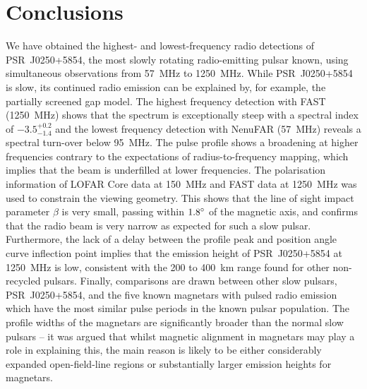 \section{Conclusions}
\label{sec: J0250 - conclusions}

We have obtained the highest- and lowest-frequency radio detections of PSR~J0250+5854, the most slowly rotating radio-emitting pulsar known, using simultaneous observations from 57~MHz to 1250~MHz. While PSR~J0250+5854 is slow, its continued radio emission can be explained by, for example, the partially screened gap model. The highest frequency detection with FAST (1250~MHz) shows that the spectrum is exceptionally steep with a spectral index of $-3.5^{+0.2}_{-1.4}$ and the lowest frequency detection with NenuFAR (57~MHz) reveals a spectral turn-over below 95~MHz. The pulse profile shows a broadening at higher frequencies contrary to the expectations of radius-to-frequency mapping, which implies that the beam is underfilled at lower frequencies. The polarisation information of LOFAR Core data at 150~MHz and FAST data at 1250~MHz was used to constrain the viewing geometry. This shows that the line of sight impact parameter $\beta$ is very small, passing within $1.8^\circ$ of the magnetic axis, and confirms that the radio beam is very narrow as expected for such a slow pulsar. Furthermore, the lack of a delay between the profile peak and position angle curve inflection point implies that the emission height of PSR~J0250+5854 at 1250~MHz is low, consistent with the 200 to 400~km range found for other non-recycled pulsars. Finally, comparisons are drawn between other slow pulsars, PSR~J0250+5854, and the five known magnetars with pulsed radio emission which have the most similar pulse periods in the known pulsar population. The profile widths of the magnetars are significantly broader than the normal slow pulsars -- it was argued that whilst magnetic alignment in magnetars may play a role in explaining this, the main reason is likely to be either considerably expanded open-field-line regions or substantially larger emission heights for magnetars.



